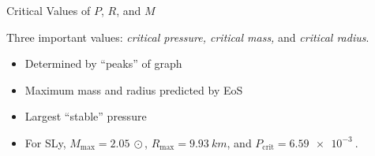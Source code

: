 \documentclass[]{beamer}
\begin{document}
\begin{frame}{Critical Values of $P$, $R$, and $M$}
\begin{figure}[h!]
\begin{subfigure}{.5\textwidth}
            \end{subfigure}
        \end{figure} \pause
        Three important values: \pause \textit{critical pressure, critical mass,} and \textit{critical radius}. \pause 
        \begin{itemize}
            \item Determined by ``peaks'' of graph \pause
            \item Maximum mass and radius predicted by EoS \pause
            \item Largest ``stable'' pressure \pause
            \item For SLy, $M_\text{max} = \SI{2.05}{\odot}$, $R_\text{max} = \SI{9.93}{km}$, and $P_\text{crit} = \SI{6.59e-3}{}$.
        \end{itemize}

    \end{frame}

\end{document}
